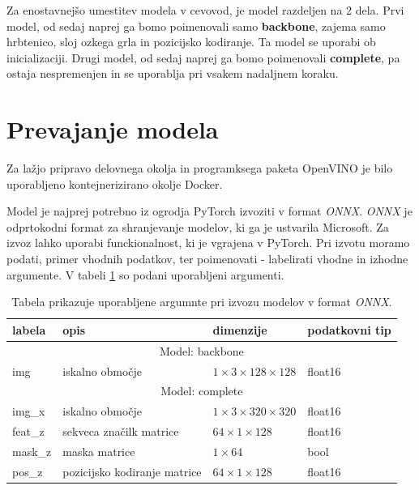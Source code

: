 \documentclass[a4paper,12pt,openright]{book}
\begin{document}
Za enostavnejšo umestitev modela v cevovod, je model razdeljen na 2 dela. Prvi model, od sedaj naprej ga bomo poimenovali samo \textbf{backbone}, zajema samo hrbtenico, sloj ozkega grla in pozicijsko kodiranje. Ta model se uporabi ob inicializaciji. Drugi model, od sedaj naprej ga bomo poimenovali \textbf{complete}, pa ostaja nespremenjen in se uporablja pri vsakem nadaljnem koraku.

\section{Prevajanje modela}
Za lažjo pripravo delovnega okolja in programksega paketa OpenVINO je bilo uporabljeno kontejnerizirano okolje Docker.

Model je najprej potrebno iz ogrodja PyTorch izvoziti v format \emph{ONNX}. \emph{ONNX} je odprtokodni format za shranjevanje modelov, ki ga je ustvarila Microsoft. Za izvoz lahko uporabi funckionalnost, ki je vgrajena v PyTorch. Pri izvotu moramo podati, primer vhodnih podatkov, ter poimenovati - labelirati vhodne in izhodne argumente. V tabeli \ref{tab:onnx} so podani uporabljeni argumenti.

\begin{table}[htb]
    \begin{tabular}{p{}|p{}|p{}|p{}}    %
        {\bf labela } & {\bf opis}                   & {\bf dimenzije}                      & {\bf podatkovni tip} \\ \hline
        \multicolumn{4}{c}{Model: backbone}                                                                        \\
        \hline
        img           & iskalno območje              & $ 1 \times 3 \times 128 \times 128 $ & float16              \\
        \hline
        \multicolumn{4}{c}{Model: complete}                                                                        \\
        \hline
        img\_x        & iskalno območje              & $ 1 \times 3 \times 320 \times 320 $ & float16              \\
        feat\_z       & sekveca značilk matrice      & $ 64 \times 1 \times 128 $           & float16              \\
        mask\_z       & maska matrice                & $ 1 \times 64  $                     & bool                 \\
        pos\_z        & pozicijsko kodiranje matrice & $ 64 \times 1 \times 128 $           & float16              \\
    \end{tabular}
    \caption{Tabela prikazuje uporabljene argumnte pri izvozu modelov v format \emph{ONNX}.}
    \label{tab:onnx}
\end{table}
\end{document}
